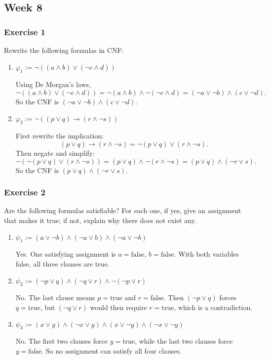 \documentclass{article}
\theoremstyle{theorem}
\theoremstyle{definition}
\theoremstyle{remark}
\begin{document}
\subsection{Week 8}

\subsubsection{Exercise 1}

Rewrite the following formulas in CNF:

\begin{enumerate}
  \item $\varphi_1 := \neg((a \land b) \lor (\neg c \land d))$

  Using De Morgan's laws,
  \[
  \neg((a \land b) \lor (\neg c \land d))
  = \neg(a \land b) \land \neg(\neg c \land d)
  = (\neg a \lor \neg b) \land (c \lor \neg d).
  \]
  So the CNF is $(\neg a \lor \neg b) \land (c \lor \neg d)$.

  \item $\varphi_2 := \neg((p \lor q) \to (r \land \neg s))$

  First rewrite the implication:
  \[
  (p \lor q) \to (r \land \neg s) = \neg(p \lor q) \lor (r \land \neg s).
  \]
  Then negate and simplify:
  \[
  \neg(\neg(p \lor q) \lor (r \land \neg s))
  = (p \lor q) \land \neg(r \land \neg s)
  = (p \lor q) \land (\neg r \lor s).
  \]
  So the CNF is $(p \lor q) \land (\neg r \lor s)$.
\end{enumerate}

\subsubsection{Exercise 2}

Are the following formulas satisfiable? For each one, if yes, give an assignment that makes it true; if not, explain why there does not exist any.

\begin{enumerate}
  \item $\psi_1 := (a \lor \neg b) \land (\neg a \lor b) \land (\neg a \lor \neg b)$
  
  Yes. One satisfying assignment is $a = \text{false}$, $b = \text{false}$.
  With both variables false, all three clauses are true.

  \item $\psi_2 := (\neg p \lor q) \land (\neg q \lor r) \land \neg(\neg p \lor r)$
  
  No. The last clause means $p = \text{true}$ and $r = \text{false}$.
  Then $(\neg p \lor q)$ forces $q = \text{true}$, but $(\neg q \lor r)$ would then require $r = \text{true}$, which is a contradiction.

  \item $\psi_3 := (x \lor y) \land (\neg x \lor y) \land (x \lor \neg y) \land (\neg x \lor \neg y)$
  
  No. The first two clauses force $y = \text{true}$, while the last two clauses force $y = \text{false}$. So no assignment can satisfy all four clauses.
\end{enumerate}
\end{document}
